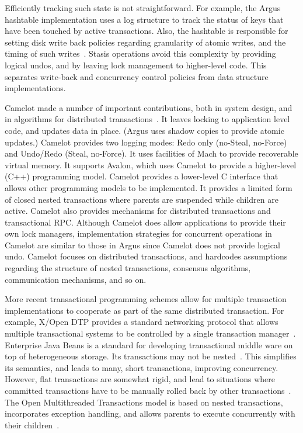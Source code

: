 \documentclass[letterpaper,twocolumn,10pt]{article}
\newcommand{\yad}{Stasis\xspace}
\begin{document}
Efficiently
tracking such state is not straightforward.  For example, the Argus
hashtable implementation uses a log structure to
track the status of keys that have been touched by 
active transactions.  Also, the hashtable is responsible for setting disk write back
policies regarding granularity of atomic writes, and the timing of such writes~\cite{argusImplementation}.  \yad operations avoid this
complexity by providing logical undos, and by leaving lock management
to higher-level code.  This separates write-back and concurrency
control policies from data structure implementations.


Camelot made a number of important
contributions, both in system design, and in algorithms for
distributed transactions~\cite{camelot}.  It leaves locking to application level code,
and updates data in place.  (Argus uses shadow copies to provide
atomic updates.)  Camelot provides two logging modes: Redo only
(no-Steal, no-Force) and Undo/Redo (Steal, no-Force).  It uses 
facilities of Mach to provide recoverable virtual memory.  It
supports Avalon, which uses Camelot to provide a
higher-level (C++) programming model.  Camelot provides a lower-level
C interface that allows other programming models to be
implemented.  It provides a limited form of closed nested transactions
where parents are suspended while children are active.  Camelot also
provides mechanisms for distributed transactions and transactional
RPC.  Although Camelot does allow applications to provide their own lock 
managers, implementation strategies for concurrent operations 
in Camelot are similar to those
in Argus since Camelot does not provide logical undo.  Camelot focuses
on distributed transactions, and hardcodes
assumptions regarding the structure of nested transactions, consensus
algorithms, communication mechanisms, and so on.

More recent transactional programming schemes allow for multiple
transaction implementations to cooperate as part of the same
distributed transaction.  For example, X/Open DTP provides a standard
networking protocol that allows multiple transactional systems to be
controlled by a single transaction manager~\cite{something}.
Enterprise Java Beans is a standard for developing transactional
middle ware on top of heterogeneous storage.  Its
transactions may not be nested~\cite{something}.  This simplifies its
semantics, and leads to many, short transactions, 
improving concurrency.  However, flat transactions are somewhat rigid, and lead to
situations where committed transactions have to be manually rolled
back by other transactions~\cite{ejbCritique}.  The Open
Multithreaded Transactions model is based on nested transactions,
incorporates exception handling, and allows parents to execute
concurrently with their children~\cite{omtt}.
\end{document}
